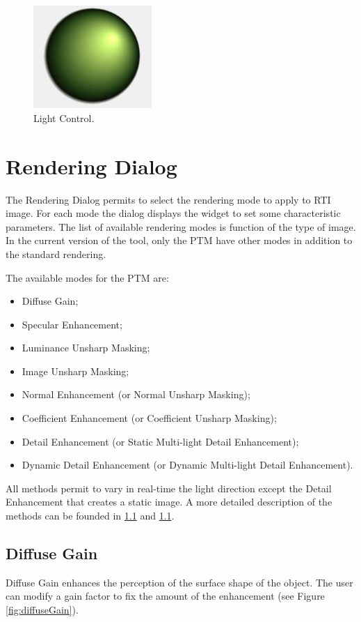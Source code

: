 \documentclass[oneside, 11pt]{book}
\begin{document}
\begin{figure}[hbt]
  \centering
  \includegraphics[width=0.4\textwidth]{lightcontrol}
  \caption{Light Control.}
  \label{fig:lightcontrol}
\end{figure}

\section{Rendering Dialog}
The Rendering Dialog permits to select the rendering mode to apply to RTI image. For each mode the dialog displays the widget to set some characteristic parameters. The list of available rendering modes is function of the type of image. In the current version of the tool, only the PTM have other modes in addition to the standard rendering.

The available modes for the PTM are:
\begin{itemize}
\item Diffuse Gain;
\item Specular Enhancement;
\item Luminance Unsharp Masking;
\item Image Unsharp Masking;
\item Normal Enhancement (or Normal Unsharp Masking);
\item Coefficient Enhancement (or Coefficient Unsharp Masking);
\item Detail Enhancement (or Static Multi-light Detail Enhancement);
\item Dynamic Detail Enhancement (or Dynamic Multi-light Detail Enhancement).
\end{itemize}

All methods permit to vary in real-time the light direction except the Detail Enhancement that creates a static image. A more detailed description of the methods can be founded in \ref{} and \ref{}.

\subsection{Diffuse Gain}
Diffuse Gain enhances the perception of the surface shape of the object. The user can modify a gain factor to fix the amount of the enhancement (see Figure \ref{fig:diffuseGain}).
\end{document}
